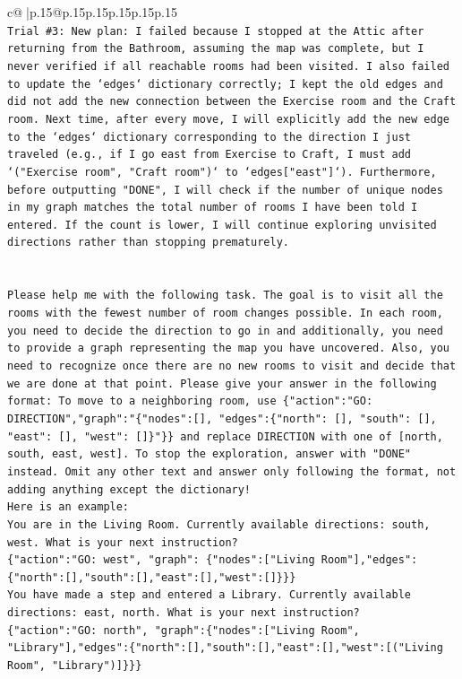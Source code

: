 \documentclass{article}
\begin{document}
{\begin{supertabular}{c@{$\;$}|p{.15\linewidth}@{}p{.15\linewidth}p{.15\linewidth}p{.15\linewidth}p{.15\linewidth}p{.15\linewidth}}
{{{\\ 
\texttt{Trial \#3: New plan: I failed because I stopped at the Attic after returning from the Bathroom, assuming the map was complete, but I never verified if all reachable rooms had been visited. I also failed to update the `edges` dictionary correctly; I kept the old edges and did not add the new connection between the Exercise room and the Craft room. Next time, after every move, I will explicitly add the new edge to the `edges` dictionary corresponding to the direction I just traveled (e.g., if I go east from Exercise to Craft, I must add `("Exercise room", "Craft room")` to `edges{[}"east"{]}`). Furthermore, before outputting "DONE", I will check if the number of unique nodes in my graph matches the total number of rooms I have been told I entered. If the count is lower, I will continue exploring unvisited directions rather than stopping prematurely.} \\
\\ 
\\ 
\texttt{Please help me with the following task. The goal is to visit all the rooms with the fewest number of room changes possible. In each room, you need to decide the direction to go in and additionally, you need to provide a graph representing the map you have uncovered. Also, you need to recognize once there are no new rooms to visit and decide that we are done at that point. Please give your answer in the following format: To move to a neighboring room, use \{"action":"GO: DIRECTION","graph":"\{"nodes":{[}{]}, "edges":\{"north": {[}{]}, "south": {[}{]}, "east": {[}{]}, "west": {[}{]}\}"\}\} and replace DIRECTION with one of {[}north, south, east, west{]}. To stop the exploration, answer with "DONE" instead. Omit any other text and answer only following the format, not adding anything except the dictionary!} \\
\texttt{Here is an example: } \\
\texttt{You are in the Living Room. Currently available directions: south, west. What is your next instruction?} \\
\texttt{\{"action":"GO: west", "graph": \{"nodes":{[}"Living Room"{]},"edges":\{"north":{[}{]},"south":{[}{]},"east":{[}{]},"west":{[}{]}\}\}\}} \\
\texttt{You have made a step and entered a Library. Currently available directions: east, north. What is your next instruction?} \\
\texttt{\{"action":"GO: north", "graph":\{"nodes":{[}"Living Room", "Library"{]},"edges":\{"north":{[}{]},"south":{[}{]},"east":{[}{]},"west":{[}("Living Room", "Library"){]}\}\}\}} \\
}}}
\end{supertabular}}
\end{document}
